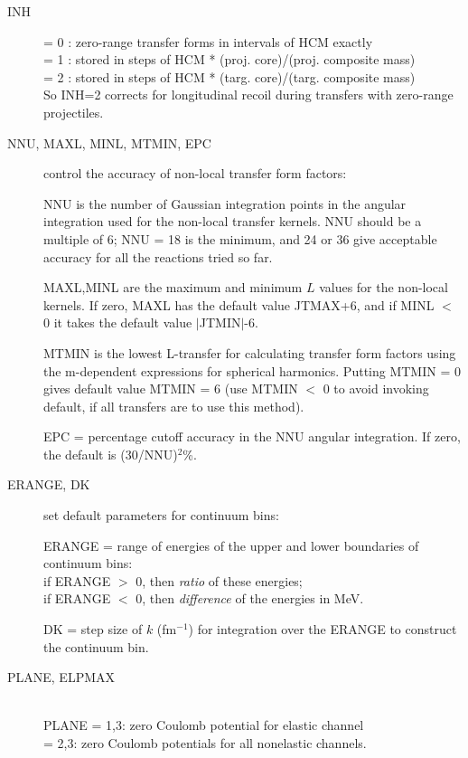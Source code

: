 \documentclass[11pt]{article}
\begin{document}
\begin{description}

\item[INH]
 = 0 : zero-range transfer forms in intervals of HCM exactly
\\ = 1 : stored in steps of HCM * (proj. core)/(proj. composite mass)
\\ = 2 : stored in steps of HCM * (targ. core)/(targ. composite mass)\\
    So INH=2 corrects for longitudinal recoil during transfers with zero-range projectiles.

\item[NNU, MAXL, MINL, MTMIN, EPC] control the accuracy of non-local transfer form factors:

NNU is the number of Gaussian integration points
in the angular
integration used for the non-local transfer kernels. NNU should
be a multiple of 6; NNU = 18 is the minimum, and 24 or 36 give
acceptable accuracy for all the reactions tried so far.


MAXL,MINL are the maximum and minimum $L$ values
for the non-local
kernels. If zero, MAXL has the default value JTMAX+6, and
if MINL $<$ 0 it takes the default value $|$JTMIN$|$-6.


MTMIN is the lowest L-transfer for calculating transfer form factors
using the m-dependent expressions for spherical harmonics.
Putting MTMIN = 0 gives default value MTMIN = 6 (use MTMIN $<$ 0 to avoid
invoking default, if all transfers are to use this method).

EPC = percentage cutoff accuracy in the NNU angular integration.
If zero, the default is (30/NNU)$^2$\%.

\item[ERANGE, DK] set default parameters for continuum bins:

ERANGE = range of energies of the upper and lower boundaries
of continuum bins:\\
if ERANGE $>$ 0, then {\em ratio} of these energies;\\
if ERANGE $<$ 0, then {\em difference} of the energies in MeV.

DK     = step size of $k$ (fm$^{-1}$) for integration over the ERANGE to construct the continuum bin.

 \item[PLANE, ELPMAX] ~\\
PLANE = 1,3: zero Coulomb potential for elastic channel\\
      = 2,3: zero Coulomb potentials for all nonelastic channels.


\end{description}
\end{document}
